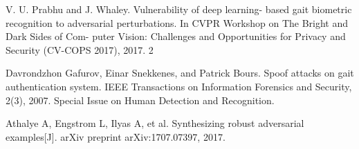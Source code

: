 \documentclass[letterpaper]{article} %
\begin{document}
\smallskip \noindent[12]V. U. Prabhu and J. Whaley. Vulnerability of deep learning-
based gait biometric recognition to adversarial perturbations.
In CVPR Workshop on The Bright and Dark Sides of Com-
puter Vision: Challenges and Opportunities for Privacy and
Security (CV-COPS 2017), 2017. 2

\smallskip \noindent [13]Davrondzhon Gafurov, Einar Snekkenes, and Patrick Bours. Spoof attacks on gait
authentication system. IEEE Transactions on Information Forensics and Security,
2(3), 2007. Special Issue on Human Detection and Recognition.

\smallskip \noindent [14] Athalye A, Engstrom L, Ilyas A, et al. Synthesizing robust adversarial examples[J]. arXiv preprint arXiv:1707.07397, 2017.
\end{document}

